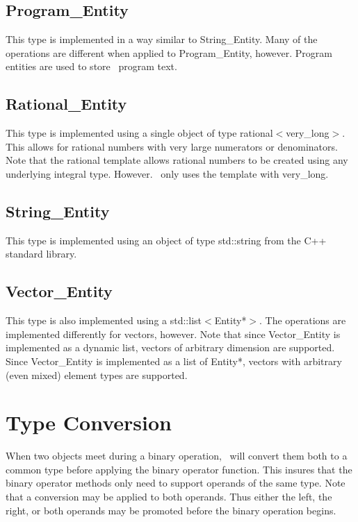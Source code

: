 \documentclass{report}
\begin{document}
\subsection{Program\_Entity}

This type is implemented in a way similar to String\_Entity. Many of the operations are
different when applied to Program\_Entity, however. Program entities are used to store \CLAC\
program text.

\subsection{Rational\_Entity}

This type is implemented using a single object of type rational$<$very\_long$>$. This allows for
rational numbers with very large numerators or denominators. Note that the rational template
allows rational numbers to be created using any underlying integral type. However. \CLAC\ only
uses the template with very\_long.

\subsection{String\_Entity}

This type is implemented using an object of type std::string from the C++ standard library.

\subsection{Vector\_Entity}

This type is also implemented using a std::list$<$Entity*$>$. The operations are implemented
differently for vectors, however. Note that since Vector\_Entity is implemented as a dynamic
list, vectors of arbitrary dimension are supported. Since Vector\_Entity is implemented as a
list of Entity*, vectors with arbitrary (even mixed) element types are supported.

\section{Type Conversion}

When two objects meet during a binary operation, \CLAC\ will convert them both to a common type
before applying the binary operator function. This insures that the binary operator methods only
need to support operands of the same type. Note that a conversion may be applied to both
operands. Thus either the left, the right, or both operands may be promoted before the binary
operation begins.
\end{document}
